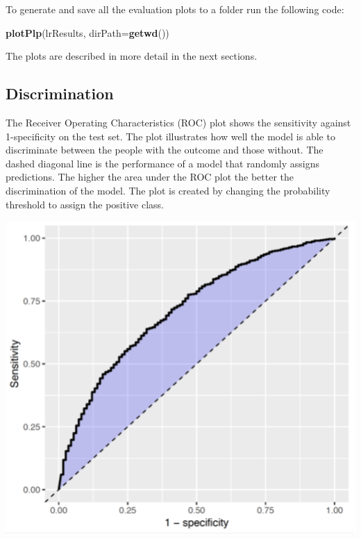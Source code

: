 \documentclass[]{book}
\newenvironment{Shaded}{\begin{snugshade}}{\end{snugshade}}
\newcommand{\KeywordTok}[1]{\textcolor[rgb]{0.13,0.29,0.53}{\textbf{#1}}}
\newcommand{\DataTypeTok}[1]{\textcolor[rgb]{0.13,0.29,0.53}{#1}}
\newcommand{\NormalTok}[1]{#1}
\begin{document}
To generate and save all the evaluation plots to a folder run the
following code:

\begin{Shaded}
\begin{Highlighting}[]
\KeywordTok{plotPlp}\NormalTok{(lrResults, }\DataTypeTok{dirPath=}\KeywordTok{getwd}\NormalTok{())}
\end{Highlighting}
\end{Shaded}

The plots are described in more detail in the next sections.

\newpage

\subsection{Discrimination}\label{discrimination}

The Receiver Operating Characteristics (ROC) plot shows the sensitivity
against 1-specificity on the test set. The plot illustrates how well the
model is able to discriminate between the people with the outcome and
those without. The dashed diagonal line is the performance of a model
that randomly assigns predictions. The higher the area under the ROC
plot the better the discrimination of the model. The plot is created by
changing the probability threshold to assign the positive class.

\includegraphics[width=1\linewidth]{images/PatientLevelPrediction/sparseROC}
\end{document}
